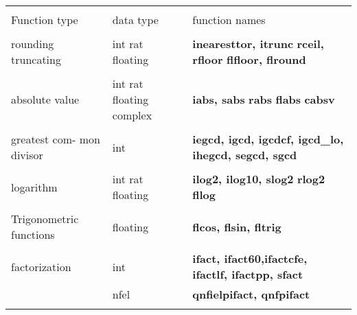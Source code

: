 \leer
\begin{center}
\begin{tabular}{|p{1.0in}|p{0.7in}|p{3.5in}|}
\hline &&\\[-1.3ex]
Function type  &
data \newline
type &
function names\\[1.5ex]
\hline &&\\[-1.3ex]

rounding \newline
truncating &
int \newline
rat \newline
floating &
{\bf inearesttor, itrunc} \newline
{\bf rceil, rfloor} \newline
{\bf flfloor, flround} \\[1.5ex]
\hline &&\\[-1.3ex]

absolute \newline
value &
int \newline
rat \newline
floating \newline
complex &
{\bf iabs, sabs} \newline
{\bf rabs} \newline
{\bf flabs} \newline
{\bf cabsv} \\[1.5ex]
\hline &&\\[-1.3ex]

greatest com- \newline
mon divisor &
int &
{\bf iegcd, igcd, igcdcf, igcd\_lo, ihegcd, segcd, sgcd}\\[1.5ex]
\hline &&\\[-1.3ex]

logarithm &
int \newline
rat \newline
floating &
{\bf ilog2, ilog10, slog2} \newline
{\bf rlog2} \newline
{\bf fllog} \\[1.5ex]
\hline &&\\[-1.3ex]

Trigonometric \newline
functions &
floating &
{\bf flcos, flsin, fltrig}\\[1.5ex]
\hline &&\\[-1.3ex]

factorization &
int &
{\bf ifact, ifact60,ifactcfe, ifactlf, ifactpp, sfact}\\
& nfel &
{\bf qnfielpifact, qnfpifact}\\[1.5ex]
\hline &&\\[-1.3ex]


\end{tabular}
\end{center}
